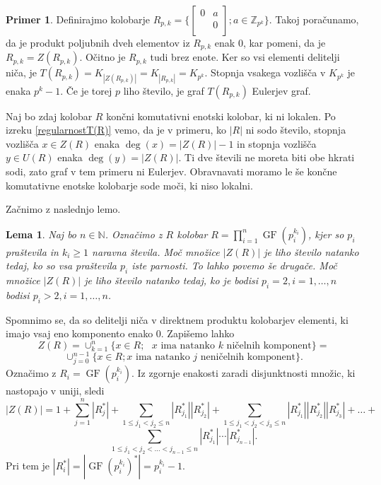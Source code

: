 \documentclass[a4paper, 12pt]{amsart}
\theoremstyle{definition} %
\newtheorem{primer}[definicija]{Primer}
\theoremstyle{plain} %
\newtheorem{lema}[definicija]{Lema}
\newcommand{\N}{\mathbb N}
\newcommand{\Z}{\mathbb Z}
\DeclareMathOperator{\GF}{GF}
\begin{document}
\begin{primer}
Definirajmo kolobarje $R_{p,k} = \big\{  
\begin{bmatrix}
0 & a \\
 & 0\\
\end{bmatrix};
a \in \Z_{p^k}
\big\}
$. 
Takoj poračunamo, da je produkt poljubnih dveh elementov iz $R_{p,k}$ enak 0, kar pomeni, da je $R_{p,k} = Z(R_{p,k})$. Očitno je $R_{p,k}$ tudi brez enote. Ker so vsi elementi delitelji niča, je $T(R_{p,k}) = K_{|Z(R_{p,k})|} = K_{|R_{p,k}|} = K_{p^k}$. Stopnja vsakega vozlišča v $K_{p^k}$ je enaka $p^k -1$. Če je torej $p$ liho število, je graf $T(R_{p,k})$ Eulerjev graf.
\end{primer}

Naj bo zdaj kolobar $R$ končni komutativni enotski kolobar, ki ni lokalen. Po izreku  \ref{regularnostT(R)} vemo, da je v primeru, ko $|R|$ ni sodo število, stopnja vozlišča $x\in Z(R)$ enaka $\deg(x) = |Z(R)| -1$ in stopnja vozlišča $y\in U(R)$ enaka $\deg(y) = |Z(R)|$. Ti dve števili ne moreta biti obe hkrati sodi, zato graf v tem primeru ni Eulerjev.
Obravnavati moramo le še končne komutativne enotske kolobarje sode moči, ki niso lokalni. 

Začnimo z naslednjo lemo.

\begin{lema}
Naj bo $n\in \N$. Označimo z $R$ kolobar $R=\prod_{i=1}^n \GF(p_i^{k_i})$, kjer so $p_i$ praštevila in $k_i\ge 1$ naravna števila. Moč množice $|Z(R)|$ je liho število natanko tedaj, ko so vsa praštevila $p_i$ iste parnosti. To lahko povemo še drugače. Moč množice $|Z(R) |$ je liho število natanko tedaj, ko je bodisi $p_i =2, i=1,\dots,n$ bodisi $p_i > 2, i =1,\dots,n$.
\end{lema}

\proof
Spomnimo se, da so delitelji niča v direktnem produktu kolobarjev elementi, ki imajo vsaj eno komponento enako 0. Zapišemo lahko 
$$
Z(R) = \cup_{k=1}^n \{x\in R; \text{ $x$ ima natanko $k$ ničelnih komponent}\}=
$$
$$
\cup_{j=0}^{n-1} \{ x\in R; \text{$x$ ima natanko $j$ neničelnih komponent} \}.
$$
Označimo z $R_i = \GF(p_i^{k_i})$. Iz zgornje enakosti zaradi disjunktnosti množic, ki nastopajo v uniji, sledi 
$$|Z(R)| = 1+ \sum_{j=1}^n |R_j^*| + \sum_{1\le j_1 < j_2 \le n} |R_{j_1}^*| |R_{j_2}^*| +  \sum_{1\le j_1 < j_2<j_3 \le n} |R_{j_1}^*| |R_{j_2}^*| |R_{j_3}^*|  + \dots + 
$$
$$
 \sum_{1\le j_1 < j_2 <\dots< j_{n-1}\le n} |R_{j_1}^*|\cdots  |R_{j_{n-1}}^*|. 
$$
Pri tem je $|R_i^*| = |\GF(p_i^{k_i})^*| = p_i^{k_i} - 1$. 
\end{document}
